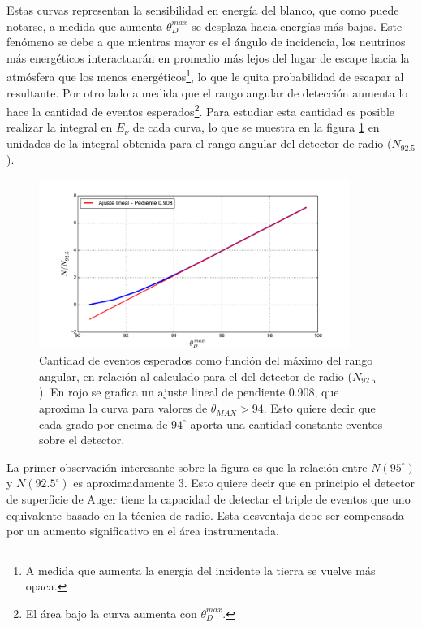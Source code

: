 	Estas curvas representan la sensibilidad en energ\'ia del blanco, que como puede notarse, a medida que aumenta $\theta_D^{max}$ se desplaza hacia energ\'ias m\'as bajas.
	Este fen\'omeno se debe a que mientras mayor es el \'angulo de incidencia, los neutrinos m\'as energ\'eticos interactuar\'an en promedio m\'as lejos del lugar de escape hacia la atm\'osfera que los menos energ\'eticos\footnote{A medida que aumenta la energ\'ia del \nutau{} incidente la tierra se vuelve m\'as opaca.}, lo que le quita probabilidad de escapar al \tauon{} resultante.
	Por otro lado a medida que el rango angular de detecci\'on aumenta lo hace la cantidad de eventos esperados\footnote{El \'area bajo la curva aumenta con $\theta_D^{max}$.}.
	Para estudiar esta cantidad es posible realizar la integral en $E_\nu$ de cada curva, lo que se muestra en la figura \ref{fig:gainThetas} en unidades de la integral obtenida para el rango angular del detector de radio ($N_{92.5}$). 
	\begin{figure}[h!]
		\begin{center}
			\includegraphics[width=0.9\textwidth]{fig/resultadosRadio/eventGain_thetas}
			\caption{\label{fig:gainThetas} Cantidad de eventos esperados como funci\'on del m\'aximo del rango angular, en relaci\'on al calculado para el del detector de radio ($N_{92.5}$).
			En rojo se grafica un ajuste lineal de pendiente 0.908, que aproxima la curva para valores de $\theta_{MAX}>94$.
			Esto quiere decir que cada grado por encima de $94^\circ$ aporta una cantidad constante eventos sobre el detector.
			}
		\end{center}
	\end{figure}
	La primer observaci\'on interesante sobre la figura es que la relaci\'on entre $N(95^\circ)$ y $N(92.5^\circ)$ es aproximadamente 3.
	Esto quiere decir que en principio el detector de superficie de Auger tiene la capacidad de detectar el triple de eventos que uno equivalente basado en la t\'ecnica de radio.
	Esta desventaja debe ser compensada por un aumento significativo en el \'area instrumentada.
	
